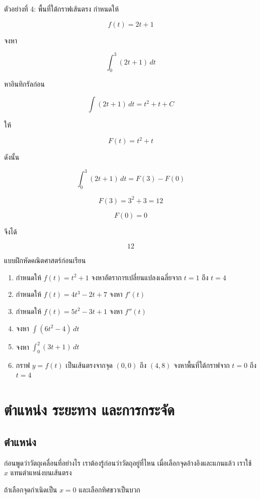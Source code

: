 \begin{examplebox}{ตัวอย่างที่ 4: พื้นที่ใต้กราฟเส้นตรง}
กำหนดให้

\[
f(t)=2t+1
\]

จงหา

\[
\int_0^3 (2t+1)\,dt
\]

หาอินทิกรัลก่อน

\[
\int (2t+1)\,dt=t^2+t+C
\]

ให้

\[
F(t)=t^2+t
\]

ดังนั้น

\[
\int_0^3 (2t+1)\,dt=F(3)-F(0)
\]

\[
F(3)=3^2+3=12
\]

\[
F(0)=0
\]

จึงได้

\[
\boxed{12}
\]
\end{examplebox}

\begin{exercisebox}{แบบฝึกหัดคณิตศาสตร์ก่อนเรียน}
\begin{enumerate}
    \item กำหนดให้ $f(t)=t^2+1$ จงหาอัตราการเปลี่ยนแปลงเฉลี่ยจาก $t=1$ ถึง $t=4$
    \item กำหนดให้ $f(t)=4t^3-2t+7$ จงหา $f'(t)$
    \item กำหนดให้ $f(t)=5t^2-3t+1$ จงหา $f''(t)$
    \item จงหา $\int (6t^2-4)\,dt$
    \item จงหา $\int_0^2 (3t+1)\,dt$
    \item กราฟ $y=f(t)$ เป็นเส้นตรงจากจุด $(0,0)$ ถึง $(4,8)$ จงหาพื้นที่ใต้กราฟจาก $t=0$ ถึง $t=4$
\end{enumerate}
\end{exercisebox}

\section{ตำแหน่ง ระยะทาง และการกระจัด}

\subsection{ตำแหน่ง}

ก่อนพูดว่าวัตถุเคลื่อนที่อย่างไร เราต้องรู้ก่อนว่าวัตถุอยู่ที่ไหน เมื่อเลือกจุดอ้างอิงและแกนแล้ว เราใช้ $x$ แทนตำแหน่งบนเส้นตรง

ถ้าเลือกจุดกำเนิดเป็น $x=0$ และเลือกทิศขวาเป็นบวก

